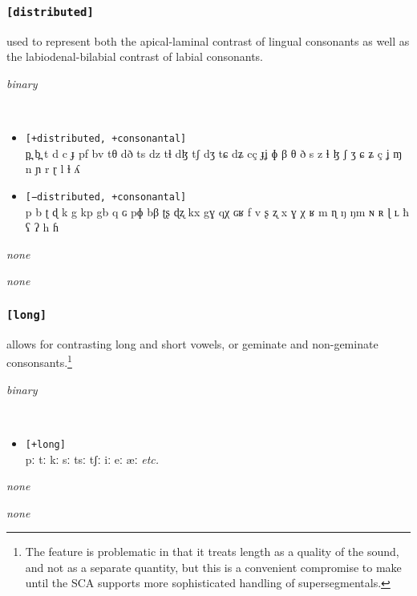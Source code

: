 \documentclass[10pt,letterpaper]{article}
\begin{document}
\subsubsection{\texttt{[distributed]}}
\label{ssub:feature_distributed}
\begin{samepage}
\begin{description}
\itemsep1pt \parskip0pt  
\item[Descritpion] used to represent both the apical-laminal contrast of lingual consonants as well as the labiodenal-bilabial contrast of labial consonants.
\item[Type] \emph{binary}
\item[Examples]\
  \begin{itemize} 
    \item \texttt{[+distributed, +consonantal]}\\
    p̪ b̪ t d c ɟ pf bv tθ dð ts dz tɬ dɮ tʃ dʒ tɕ dʑ cç ɟʝ ɸ β θ ð s z ɬ ɮ ʃ ʒ ɕ ʑ ç ʝ ɱ n ɲ r ɽ l ɫ ʎ 
    \item \texttt{[−distributed, +consonantal]}\\
    p b ʈ ɖ k g kp gb q ɢ pɸ bβ ʈʂ ɖʐ kx gɣ qχ ɢʁ f v ʂ ʐ x ɣ χ ʁ m ɳ ŋ ŋm ɴ ʀ ɭ ʟ ħ ʕ ʔ h ɦ 
  \end{itemize}
\item[Constraints] \emph{none}
\item[Resctrictions] \emph{none}
\end{description}
\end{samepage}

\subsubsection{\texttt{[long]}}
\label{ssub:feature_long}
\begin{samepage}
\begin{description}
\itemsep1pt \parskip0pt  
\item[Descritpion] allows for contrasting long and short vowels, or geminate and non-geminate consonsants.\footnote{The feature is problematic in that it treats length as a quality of the sound, and not as a separate quantity, but this is a convenient compromise to make until the SCA supports more sophisticated handling of supersegmentals.}
\item[Type] \emph{binary}
\item[Examples]\
  \begin{itemize}
    \item \texttt{[+long]}\\
    pː tː kː sː tsː tʃː iː eː æː \emph{etc.}
  \end{itemize}
\item[Constraints] \emph{none}
\item[Resctrictions] \emph{none}
\end{description}
\end{samepage}
\end{document}

